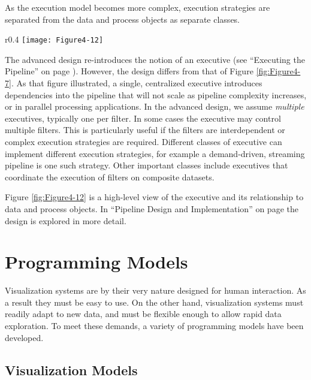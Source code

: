 As the execution model becomes more complex, execution strategies are separated from the data and process objects as separate classes.

\begin{wrapfigure}{r}{0.4\textwidth}
  \centering
  \texttt{[image: Figure4-12]}\\
  \caption{As the execution model becomes more complex, execution strategies are separated from the data and process objects as separate classes.}\label{fig:Figure4-12}
\end{wrapfigure}

The advanced design re-introduces the notion of an executive (see ``Executing the Pipeline'' on page \pageref{sec:executing_pipeline}). However, the design differs from that of Figure \ref{fig:Figure4-7}. As that figure illustrated, a single, centralized executive introduces dependencies into the pipeline that will not scale as pipeline complexity increases, or in parallel processing applications. In the advanced design, we assume \emph{multiple} executives, typically one per filter. In  some cases the executive may control multiple filters. This is particularly useful if the filters are interdependent or complex execution strategies are required. Different classes of executive can implement different execution strategies, for example a demand-driven, streaming pipeline is one such strategy. Other important classes include executives that coordinate the execution of filters on composite datasets.

Figure \ref{fig:Figure4-12} is a high-level view of the executive and its relationship to data and process objects. In ``Pipeline Design and Implementation'' on page \pageref{subsec:pipeline_design_implementation} the design is explored in more detail.

\section{Programming Models}
\label{sec:programming_models}

Visualization systems are by their very nature designed for human interaction. As a result they must be easy to use. On the other hand, visualization systems must readily adapt to new data, and must be flexible enough to allow rapid data exploration. To meet these demands, a variety of programming models have been developed.

\subsection{Visualization Models}
\label{subsec:visualization_models}

